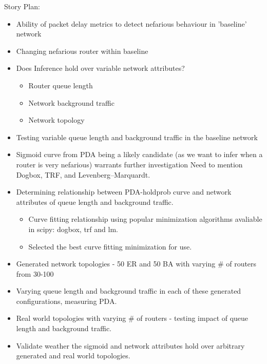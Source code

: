     Story Plan:
    \begin{itemize}
        \item Ability of packet delay metrics to detect nefarious behaviour in 'baseline' network
        \item Changing nefarious router within baseline
        \item Does Inference hold over variable network attributes?
        \begin{itemize}
            \item Router queue length
            \item Network background traffic
            \item Network topology
        \end{itemize}
        \item Testing variable queue length and background traffic in the baseline network
        \item Sigmoid curve from PDA being a likely candidate (as we want to infer when a router is very nefarious) warrants further investigation Need to mention Dogbox, TRF, and Levenberg–Marquardt.
        \item Determining relationship between PDA-holdprob curve and network attributes of queue length and background traffic.
        \begin{itemize}
            \item Curve fitting relationship using popular minimization algorithms avaliable in scipy: dogbox, trf and lm.
            \item Selected the best curve fitting minimization for use.
        \end{itemize}
        \item Generated network topologies - 50 ER and 50 BA with varying \# of routers from 30-100
        \item Varying queue length and background traffic in each of these generated configurations, measuring PDA.
        \item Real world topologies with varying \# of routers - testing impact of queue length and background traffic.
        \item Validate weather the sigmoid and network attributes hold over arbitrary generated and real world topologies.
    \end{itemize}
    

